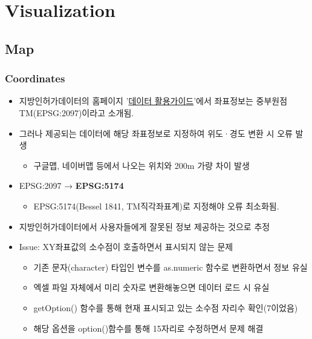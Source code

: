 \documentclass[
]{book}
\providecommand{\tightlist}{%
  \setlength{\itemsep}{0pt}\setlength{\parskip}{0pt}}
\begin{document}
\hypertarget{visualization}{%
\chapter{Visualization}\label{visualization}}

\hypertarget{map}{%
\section{Map}\label{map}}

\hypertarget{coordinates}{%
\subsection{Coordinates}\label{coordinates}}

\begin{itemize}
\item
  지방인허가데이터의 홈페이지 '\href{https://www.localdata.go.kr/portal/portalDataGuide.do?menuNo=30002}{데이터 활용가이드}'에서 좌표정보는 중부원점TM(EPSG:2097)이라고 소개됨.
\item
  그러나 제공되는 데이터에 해당 좌표정보로 지정하여 위도·경도 변환 시 오류 발생

  \begin{itemize}
  \tightlist
  \item
    구글맵, 네이버맵 등에서 나오는 위치와 200m 가량 차이 발생
  \end{itemize}
\item
  EPSG:2097 → \textbf{EPSG:5174}

  \begin{itemize}
  \tightlist
  \item
    EPSG:5174(Bessel 1841, TM직각좌표계)로 지정해야 오류 최소화됨.
  \end{itemize}
\item
  지방인허가데이터에서 사용자들에게 잘못된 정보 제공하는 것으로 추정
\item
  Issue: XY좌표값의 소수점이 호출하면서 표시되지 않는 문제

  \begin{itemize}
  \item
    기존 문자(character) 타입인 변수를 as.numeric 함수로 변환하면서 정보 유실
  \item
    엑셀 파일 자체에서 미리 숫자로 변환해놓으면 데이터 로드 시 유실
  \item
    getOption() 함수를 통해 현재 표시되고 있는 소수점 자리수 확인(7이었음)
  \item
    해당 옵션을 option()함수를 통해 15자리로 수정하면서 문제 해결
  \end{itemize}
\end{itemize}
\end{document}
